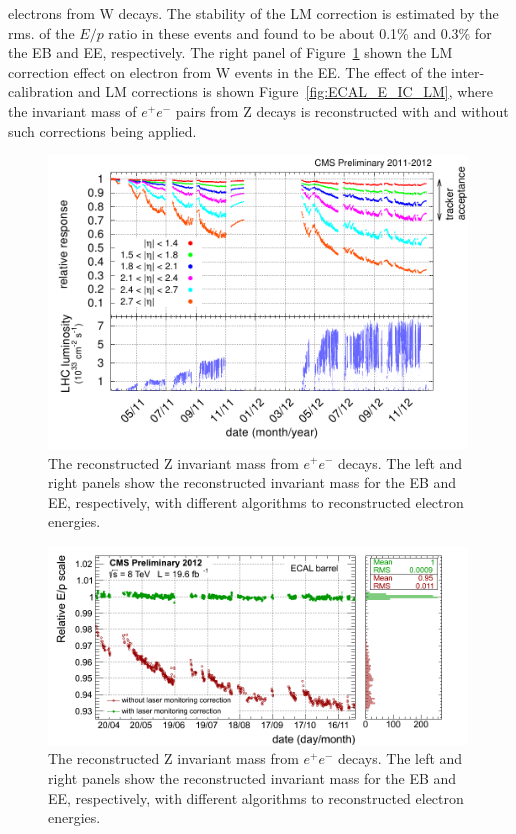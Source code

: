 electrons from W decays. The stability of the LM correction is
estimated by the rms. of the $E/p$ ratio in these events and found to
be about 0.1\% and 0.3\% for the EB and EE, respectively. The right
panel of Figure~\ref{fig:ECAL_Transparency1} shown the LM correction
effect on electron from W events in the EE. The effect of the
inter-calibration and LM corrections is shown Figure~\ref{fig:ECAL_E_IC_LM}, where
the invariant mass of $e^{+}e^{-}$ pairs from Z decays is
reconstructed with and without such corrections being applied.
\begin{figure}
 \centering
\includegraphics[width=0.99\textwidth]{CMS_DetectorFigures/histories_2011-2012.png}
\caption{The reconstructed Z invariant mass from $e^{+}e^{-}$
  decays. The left and right panels show the reconstructed invariant mass for
  the EB and EE, respectively, with different algorithms to reconstructed electron energies.\label{fig:ECAL_Transparency1}}
\end{figure}

\begin{figure}
 \centering
\includegraphics[width=0.99\textwidth]{CMS_DetectorFigures/approval_EB_Winter2013.png}
\caption{The reconstructed Z invariant mass from $e^{+}e^{-}$
  decays. The left and right panels show the reconstructed invariant mass for
  the EB and EE, respectively, with different algorithms to reconstructed electron energies.\label{fig:ECAL_response}}
\end{figure}

